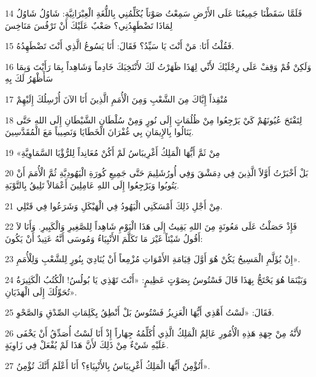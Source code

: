 \par 14 فَلَمَّا سَقَطْنَا جَمِيعُنَا عَلَى الأَرْضِ سَمِعْتُ صَوْتاً يُكَلِّمُنِي بِاللُّغَةِ الْعِبْرَانِيَّةِ: شَاوُلُ شَاوُلُ لِمَاذَا تَضْطَهِدُنِي؟ صَعْبٌ عَلَيْكَ أَنْ تَرْفُسَ مَنَاخِسَ
\par 15 فَقُلْتُ أَنَا: مَنْ أَنْتَ يَا سَيِّدُ؟ فَقَالَ: أَنَا يَسُوعُ الَّذِي أَنْتَ تَضْطَهِدُهُ.
\par 16 وَلَكِنْ قُمْ وَقِفْ عَلَى رِجْلَيْكَ لأَنِّي لِهَذَا ظَهَرْتُ لَكَ لأَنْتَخِبَكَ خَادِماً وَشَاهِداً بِمَا رَأَيْتَ وَبِمَا سَأَظْهَرُ لَكَ بِهِ
\par 17 مُنْقِذاً إِيَّاكَ مِنَ الشَّعْبِ وَمِنَ الْأُمَمِ الَّذِينَ أَنَا الآنَ أُرْسِلُكَ إِلَيْهِمْ
\par 18 لِتَفْتَحَ عُيُونَهُمْ كَيْ يَرْجِعُوا مِنْ ظُلُمَاتٍ إِلَى نُورٍ وَمِنْ سُلْطَانِ الشَّيْطَانِ إِلَى اللهِ حَتَّى يَنَالُوا بِالإِيمَانِ بِي غُفْرَانَ الْخَطَايَا وَنَصِيباً مَعَ الْمُقَدَّسِينَ.
\par 19 «مِنْ ثَمَّ أَيُّهَا الْمَلِكُ أَغْرِيبَاسُ لَمْ أَكُنْ مُعَانِداً لِلرُّؤْيَا السَّمَاوِيَّةِ
\par 20 بَلْ أَخْبَرْتُ أَوَّلاً الَّذِينَ فِي دِمَشْقَ وَفِي أُورُشَلِيمَ حَتَّى جَمِيعِ كُورَةِ الْيَهُودِيَّةِ ثُمَّ الْأُمَمَ أَنْ يَتُوبُوا وَيَرْجِعُوا إِلَى اللهِ عَامِلِينَ أَعْمَالاً تَلِيقُ بِالتَّوْبَةِ.
\par 21 مِنْ أَجْلِ ذَلِكَ أَمْسَكَنِي الْيَهُودُ فِي الْهَيْكَلِ وَشَرَعُوا فِي قَتْلِي.
\par 22 فَإِذْ حَصَلْتُ عَلَى مَعُونَةٍ مِنَ اللهِ بَقِيتُ إِلَى هَذَا الْيَوْمِ شَاهِداً لِلصَّغِيرِ وَالْكَبِيرِ. وَأَنَا لاَ أَقُولُ شَيْئاً غَيْرَ مَا تَكَلَّمَ الأَنْبِيَاءُ وَمُوسَى أَنَّهُ عَتِيدٌ أَنْ يَكُونَ:
\par 23 إِنْ يُؤَلَّمِ الْمَسِيحُ يَكُنْ هُوَ أَوَّلَ قِيَامَةِ الأَمْوَاتِ مُزْمِعاً أَنْ يُنَادِيَ بِنُورٍ لِلشَّعْبِ وَلِلْأُمَمِ».
\par 24 وَبَيْنَمَا هُوَ يَحْتَجُّ بِهَذَا قَالَ فَسْتُوسُ بِصَوْتٍ عَظِيمٍ: «أَنْتَ تَهْذِي يَا بُولُسُ! الْكُتُبُ الْكَثِيرَةُ تُحَوِّلُكَ إِلَى الْهَذَيَانِ».
\par 25 فَقَالَ: «لَسْتُ أَهْذِي أَيُّهَا الْعَزِيزُ فَسْتُوسُ بَلْ أَنْطِقُ بِكَلِمَاتِ الصِّدْقِ وَالصَّحْوِ.
\par 26 لأَنَّهُ مِنْ جِهَةِ هَذِهِ الْأُمُورِ عَالِمٌ الْمَلِكُ الَّذِي أُكَلِّمُهُ جِهَاراً إِذْ أَنَا لَسْتُ أُصَدِّقُ أَنْ يَخْفَى عَلَيْهِ شَيْءٌ مِنْ ذَلِكَ لأَنَّ هَذَا لَمْ يُفْعَلْ فِي زَاوِيَةٍ.
\par 27 أَتُؤْمِنُ أَيُّهَا الْمَلِكُ أَغْرِيبَاسُ بِالأَنْبِيَاءِ؟ أَنَا أَعْلَمُ أَنَّكَ تُؤْمِنُ».
